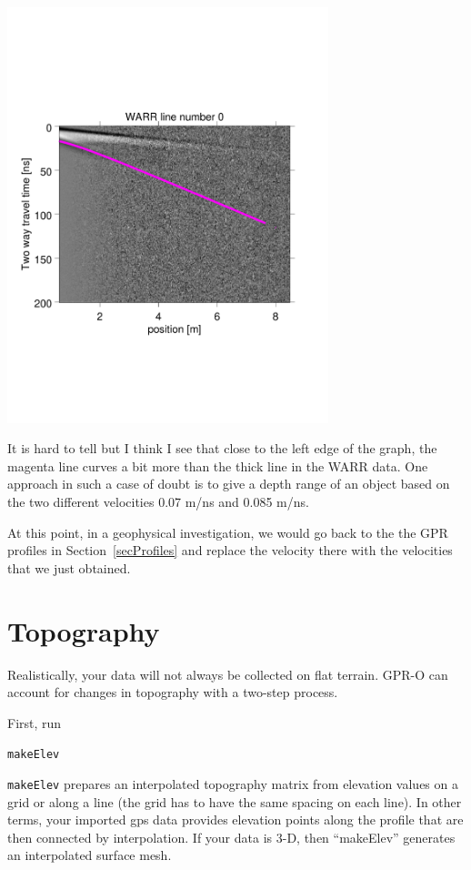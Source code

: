\documentclass[11pt]{article}
\begin{document}
\begin{center}
  \includegraphics[width=0.7\textwidth,trim = 0.9cm 6cm 2cm
    6.5cm,clip]{figures/WARRhyperb}
\end{center}

It is hard to tell but I think I see that close to the left edge of
the graph, the magenta line curves a bit more than the thick line in
the WARR data.  One approach in such a case of doubt is to give a
depth range of an object based on the two different velocities 0.07
m/ns and 0.085 m/ns.

At this point, in a geophysical investigation, we would go back to the
the GPR profiles in Section~\ref{secProfiles} and replace the velocity
there with the velocities that we just obtained.

\section{Topography}

Realistically, your data will not always be collected on flat terrain. 
GPR-O can account for changes in topography with a two-step process.

First, run

\qquad \verb#makeElev#

\verb#makeElev# prepares an interpolated topography matrix from elevation
values on a grid or along a line (the grid has to have the same spacing on each
line). In other terms, your imported gps data provides elevation points along the profile
that are then connected by interpolation. If your data is 3-D, then ``makeElev''
generates an interpolated surface mesh. 
\end{document}
